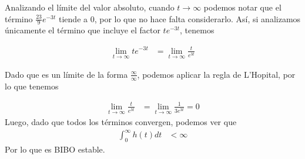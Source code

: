 \documentclass[
  11pt,
  letterpaper,
   addpoints,
  answers
  ]{exam}
\begin{document}
\begin{questions}
\begin{solution}
    
    Analizando el límite del valor absoluto, cuando \( t \to \infty \) podemos notar que el término \( \frac{23}{9}e^{-3t} \) tiende a 0, por lo que no hace falta considerarlo. Así, si analizamos únicamente el término que incluye el factor \( te^{-3t} \), tenemos

\begin{align}
\lim_{t \to \infty} te^{-3t} &= \lim_{t \to \infty} \frac{t}{e^{3t}} 
\end{align}

Dado que es un límite de la forma \( \frac{\infty}{\infty} \), podemos aplicar la regla de L'Hopital, por lo que tenemos

\begin{align}
\lim_{t \to \infty} \frac{t}{e^{3t}} &= \lim_{t \to \infty} \frac{1}{3e^{3t}} = 0 
\end{align}
Luego, dado que todos los términos convergen, podemos ver que
\begin{align}
\int_0^\infty h(t) dt &< \infty 
\end{align}
Por lo que es BIBO estable.

\end{solution}
\end{questions}
\end{document}

